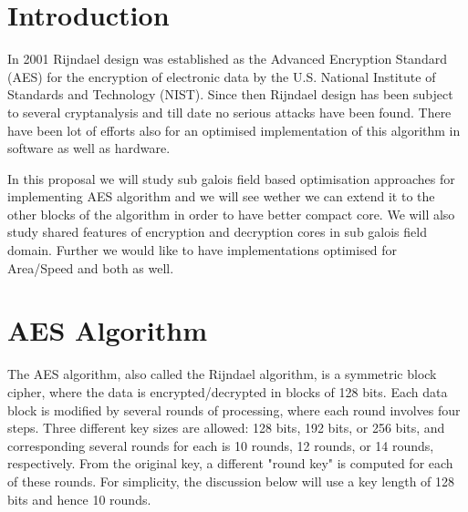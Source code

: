 \documentclass[10pt, conference, compsocconf]{IEEEtran}
\begin{document}
\maketitle



\section{Introduction}
In 2001 Rijndael design was established as the Advanced Encryption Standard (AES) for the encryption of electronic data by the U.S. National Institute of Standards and Technology (NIST). Since then Rijndael design has been subject to several cryptanalysis and till date no serious attacks have been found. There have been lot of efforts also for an optimised implementation of this algorithm in software as well as hardware.

In this proposal we will study sub galois field based optimisation approaches for implementing AES algorithm and we will see wether we can extend it to the other blocks of the algorithm in order to have better compact core. We will also study shared features of encryption and decryption cores in sub galois field domain. Further we would like to have implementations optimised for Area/Speed and both as well.

\section{AES Algorithm}
The AES algorithm, also called the Rijndael algorithm, is a symmetric block cipher, where the data is encrypted/decrypted in blocks of 128 bits. Each data block is modified by several rounds of processing, where each round involves four steps. Three different key sizes are allowed: 128 bits, 192 bits, or 256 bits, and corresponding several rounds for each is 10 rounds, 12 rounds, or 14 rounds, respectively. From the original key, a different "round key" is computed for each of these rounds. For simplicity, the discussion below will use a key length of 128 bits and hence 10 rounds.
\end{document}
